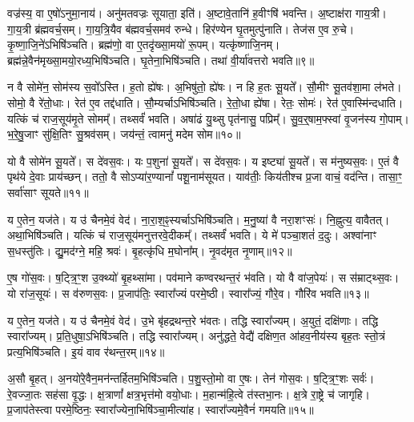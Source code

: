 वज्र॑स्य॒ वा ए॒षो॑\-ऽनुमा॒नाय॑।
अनु॑मतवज्रः सूयाता॒ इति॑।
अ॒ष्टावे॒तानि॑ ह॒वीꣳषि॑ भवन्ति।
अ॒ष्टाक्ष॑रा गाय॒त्री।
गा॒य॒त्री ब्र॑ह्म\-वर्च॒सम्।
गा॒य॒त्रि॒यैव ब॑ह्म\-वर्च॒समव॑ रुन्धे।
हिर॑ण्येन घृ॒तमुत्पु॑नाति।
तेज॑स ए॒व रु॒चे।
कृ॒ष्णा॒जि॒ने॑\-ऽभिषि॑ञ्चति।
ब्रह्म॑णो॒ वा ए॒तदृ॑ख्सा॒मयो॑ रू॒पम्।
यत्कृ॑ष्णाजि॒नम्।
ब्रह्म॑न्ने॒वैन॑मृख्सा॒मयो॒रध्य॒भिषि॑ञ्चति।
घृ॒तेना॒भिषि॑ञ्चति।
तथा॑ वी॒र्या॑वत्तरो भवति॥९॥\anuvakamend[स॒ङ्गच्छे॑ते भाग॒धेये॒नान्व॑मन्येताꣳ रू॒पं च॒त्वारि॑ च]

न वै सोमे॑न॒ सोम॑स्य स॒वो᳚\-ऽस्ति।
ह॒तो ह्ये॑षः।
अ॒भिषु॑तो॒ ह्ये॑षः।
न हि ह॒तः सू॒यते᳚।
सौ॒मीꣳ सू॒तव॑शा॒मा ल॑भते।
सोमो॒ वै रे॑तो॒धाः।
रेत॑ ए॒व तद्द॑धाति।
सौ॒म्यर्चा\-ऽभिषि॑ञ्चति।
रे॒तो॒धा ह्ये॑षा।
रेतः॒ सोमः॑।
रेत॑ ए॒वास्मि॑न्दधाति।
यत्किं च॑ राज॒सूय॑मृ॒ते सोमम्᳚।
तथ्सर्वं॑ भवति।
अषा॑ढं यु॒थ्सु पृत॑नासु॒ पप्रिम्᳚।
सु॒व॒र्॒षाम॒फ्स्वां वृ॒जन॑स्य गो॒पाम्।
भ॒रे॒षु॒जाꣳ सु॑क्षि॒तिꣳ सु॒श्रव॑सम्।
जय॑न्तं॒ त्वामनु॑ मदेम सोम॥१०॥\anuvakamend[रेतः॒ सोमः॑ स॒प्त च॑]

यो वै सोमे॑न सू॒यते᳚।
स दे॑वस॒वः।
यः प॒शुना॑ सू॒यते᳚।
स दे॑वस॒वः।
य इष्ट्या॑ सू॒यते᳚।
स म॑नुष्यस॒वः।
ए॒तं वै पृथ॑ये दे॒वाः प्राय॑च्छन्।
ततो॒ वै सोऽप्या॑र॒ण्यानां᳚ पशू॒नाम॑सूयत।
याव॑तीः॒ किय॑तीश्च प्र॒जा वाचं॒ वद॑न्ति।
तासा॒ꣳ॒ सर्वा॑साꣳ सूयते॥११॥

य ए॒तेन॒ यज॑ते।
य उ॑ चैनमे॒वं वेद॑।
ना॒रा॒श॒ꣴ॒स्यर्चा\-ऽभिषि॑ञ्चति।
म॒नु॒ष्या॑ वै नरा॒शꣳसः॑।
नि॒ह्नुत्य॒ वावैतत्।
अथा॒भिषि॑ञ्चति।
यत्किं च॑ राज॒सूय॑मनुत्तरवे॒दीकम्᳚।
तथ्सर्वं॑ भवति।
ये मे॑ पञ्चा॒शतं॑ द॒दुः।
अश्वा॑नाꣳ स॒धस्तु॑तिः।
द्यु॒मद॑ग्ने॒ महि॒ श्रवः॑।
बृ॒हत्कृ॑धि म॒घोना᳚म्।
नृ॒वद॑मृत नृ॒णाम्॥१२॥\anuvakamend[सू॒य॒ते॒ स॒धस्तु॑ति॒स्त्रीणि॑ च]

ए॒ष गो॑स॒वः।
ष॒ट्त्रि॒ꣳ॒श उ॒क्थ्यो॑ बृ॒हथ्सा॑मा।
पव॑माने कण्वरथन्त॒रं भ॑वति।
यो वै वा॑ज॒पेयः॑।
स स॑म्राट्थ्स॒वः।
यो रा॑ज॒सूयः॑।
स व॑रुणस॒वः।
प्र॒जा\-प॑तिः॒ स्वारा᳚ज्यं परमे॒ष्ठी।
स्वारा᳚ज्यं॒ गौरे॒व।
गौरि॑व भवति॥१३॥

य ए॒तेन॒ यज॑ते।
य उ॑ चैनमे॒वं वेद॑।
उ॒भे बृ॑हद्रथन्त॒रे भ॑वतः।
तद्धि स्वारा᳚ज्यम्।
अ॒युतं॒ दक्षि॑णाः।
तद्धि स्वारा᳚ज्यम्।
प्र॒ति॒धुषा॒\-ऽभिषि॑ञ्चति।
तद्धि स्वारा᳚ज्यम्।
अनु॑द्धते॒ वेद्यै॑ दक्षिण॒त आ॑\-हव॒नी\-य॑स्य बृह॒तः स्तो॒त्रं प्रत्य॒भिषि॑ञ्चति।
इ॒यं वाव र॑थन्त॒रम्॥१४॥

अ॒सौ बृ॒हत्।
अ॒नयो॑रे॒वैन॒मन॑न्तर्\mbox{}हितम॒भिषि॑ञ्चति।
प॒शु॒स्तो॒मो वा ए॒षः।
तेन॑ गोस॒वः।
ष॒ट्त्रि॒ꣳ॒शः सर्वः॑।
रे॒वज्जा॒तः सह॑सा वृ॒द्धः।
क्ष॒त्राणां᳚ क्षत्र॒भृत्त॑मो वयो॒धाः।
म॒हान्म॑हि॒त्वे त॑स्तभा॒नः।
क्ष॒त्रे रा॒ष्ट्रे च॑ जागृहि।
प्र॒जा\-प॑तेस्त्वा परमे॒ष्ठिनः॒ स्वारा᳚ज्येना॒भिषि॑ञ्चा॒मीत्या॑ह।
स्वारा᳚ज्यमे॒वैनं॑ गमयति॥१५॥\anuvakamend[इ॒व॒ भ॒व॒ति॒ र॒थ॒न्त॒रमा॒हैकं॑ च]

